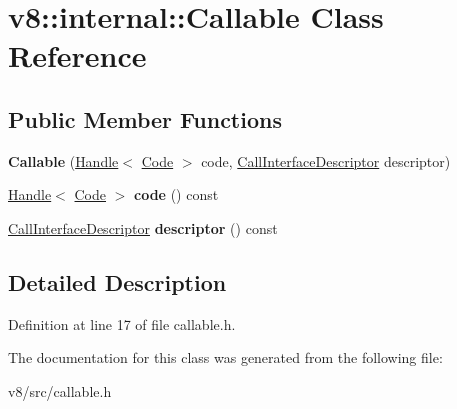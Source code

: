 \hypertarget{classv8_1_1internal_1_1Callable}{}\section{v8\+:\+:internal\+:\+:Callable Class Reference}
\label{classv8_1_1internal_1_1Callable}
\subsection*{Public Member Functions}
\begin{DoxyCompactItemize}
\item 
\mbox{\label{classv8_1_1internal_1_1Callable_a8b61d5c984082978f1785df2e497fd58}} 
{\bfseries Callable} (\mbox{\hyperlink{classv8_1_1internal_1_1Handle}{Handle}}$<$ \mbox{\hyperlink{classv8_1_1internal_1_1Code}{Code}} $>$ code, \mbox{\hyperlink{classv8_1_1internal_1_1CallInterfaceDescriptor}{Call\+Interface\+Descriptor}} descriptor)
\item 
\mbox{\label{classv8_1_1internal_1_1Callable_a9e9647db211dfb8b2abd2ed8df928aec}} 
\mbox{\hyperlink{classv8_1_1internal_1_1Handle}{Handle}}$<$ \mbox{\hyperlink{classv8_1_1internal_1_1Code}{Code}} $>$ {\bfseries code} () const
\item 
\mbox{\label{classv8_1_1internal_1_1Callable_a4f3e57cbe67f319c823dcd3ba668d274}} 
\mbox{\hyperlink{classv8_1_1internal_1_1CallInterfaceDescriptor}{Call\+Interface\+Descriptor}} {\bfseries descriptor} () const
\end{DoxyCompactItemize}


\subsection{Detailed Description}


Definition at line 17 of file callable.\+h.



The documentation for this class was generated from the following file\+:\begin{DoxyCompactItemize}
\item 
v8/src/callable.\+h\end{DoxyCompactItemize}
